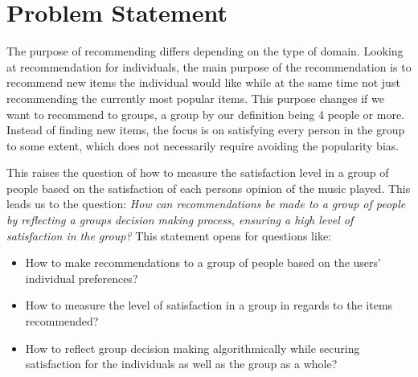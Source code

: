 	\section{Problem Statement}
The purpose of recommending differs depending on the type of domain. Looking at recommendation for individuals, the main purpose of the recommendation is to recommend new items the individual would like while at the same time not just recommending the currently most popular items. This purpose changes if we want to recommend to groups, a group by our definition being 4 people or more. Instead of finding new items, the focus is on satisfying every person in the group to some extent, which does not necessarily require avoiding the popularity bias. 

This raises the question of how to measure the satisfaction level in a group of people based on the satisfaction of each persons opinion of the music played. This leads us to the question:
\textit{How can recommendations be made to a group of people by reflecting a groups decision making process, ensuring a high level of satisfaction in the group?} This statement opens for questions like:
\begin{itemize}
\item How to make recommendations to a group of people based on the users' individual preferences?
\item How to measure the level of satisfaction in a group in regards to the items recommended?
\item How to reflect group decision making algorithmically while securing satisfaction for the individuals as well as the group as a whole?
\end{itemize}